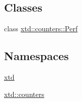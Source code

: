 \subsection*{Classes}
\begin{DoxyCompactItemize}
\item 
class \hyperlink{classxtd_1_1counters_1_1Perf}{xtd\-::counters\-::\-Perf}
\end{DoxyCompactItemize}
\subsection*{Namespaces}
\begin{DoxyCompactItemize}
\item 
\hyperlink{namespacextd}{xtd}
\item 
\hyperlink{namespacextd_1_1counters}{xtd\-::counters}
\end{DoxyCompactItemize}
